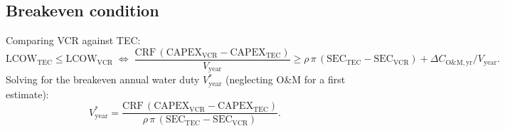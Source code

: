 \documentclass[11pt,a4paper]{article}
\begin{document}
\subsection{Breakeven condition}
Comparing VCR against TEC:
\begin{equation}
\mathrm{LCOW}_{\mathrm{TEC}}\le \mathrm{LCOW}_{\mathrm{VCR}}
\;\Longleftrightarrow\;
\frac{\mathrm{CRF}\,(\mathrm{CAPEX}_{\mathrm{VCR}}-\mathrm{CAPEX}_{\mathrm{TEC}})}{V_{\mathrm{year}}}
\ge \rho\,\pi\,(\mathrm{SEC}_{\mathrm{TEC}}-\mathrm{SEC}_{\mathrm{VCR}})+\Delta C_{\mathrm{O\&M,yr}}/V_{\mathrm{year}}.
\label{eq:breakeven}
\end{equation}
Solving for the breakeven annual water duty $V_{\mathrm{year}}^{*}$ (neglecting O\&M for a first estimate):
\begin{equation}
V_{\mathrm{year}}^{*}
=\frac{\mathrm{CRF}\,(\mathrm{CAPEX}_{\mathrm{VCR}}-\mathrm{CAPEX}_{\mathrm{TEC}})}
{\rho\,\pi\,(\mathrm{SEC}_{\mathrm{TEC}}-\mathrm{SEC}_{\mathrm{VCR}})}.
\label{eq:Vstar}
\end{equation}
\end{document}
